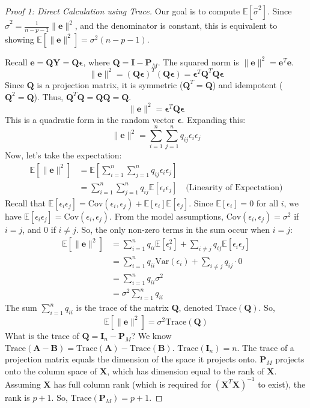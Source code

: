 \documentclass[11pt, letterpaper]{article}
\theoremstyle{definition}
\newcommand{\E}{\mathbb{E}}
\newcommand{\Var}{\text{Var}}
\newcommand{\Cov}{\text{Cov}}
\newcommand{\Trace}{\text{Trace}}
\newcommand{\mat}[1]{\mathbf{#1}} %
\newcommand{\vect}[1]{\boldsymbol{#1}} %
\newcommand{\T}{^T} %
\begin{document}
\begin{proof}[Proof 1: Direct Calculation using Trace]
Our goal is to compute $\E[\hat{\sigma}^2]$. Since $\hat{\sigma}^2 = \frac{1}{n-p-1} \|\vect{e}\|^2$, and the denominator is constant, this is equivalent to showing $\E[\|\vect{e}\|^2] = \sigma^2(n-p-1)$.

Recall $\vect{e} = \mat{Q}\vect{Y} = \mat{Q}\vect{\epsilon}$, where $\mat{Q} = \mat{I} - \mat{P}_M$. The squared norm is $\|\vect{e}\|^2 = \vect{e}\T\vect{e}$.
\[
\|\vect{e}\|^2 = (\mat{Q}\vect{\epsilon})\T (\mat{Q}\vect{\epsilon}) = \vect{\epsilon}\T \mat{Q}\T \mat{Q} \vect{\epsilon}
\]
Since $\mat{Q}$ is a projection matrix, it is symmetric ($\mat{Q}\T = \mat{Q}$) and idempotent ($\mat{Q}^2 = \mat{Q}$). Thus, $\mat{Q}\T\mat{Q} = \mat{Q}\mat{Q} = \mat{Q}$.
\[
\|\vect{e}\|^2 = \vect{\epsilon}\T \mat{Q} \vect{\epsilon}
\]
This is a quadratic form in the random vector $\vect{\epsilon}$. Expanding this:
\[
\|\vect{e}\|^2 = \sum_{i=1}^n \sum_{j=1}^n q_{ij} \epsilon_i \epsilon_j
\]
Now, let's take the expectation:
\begin{align*}
\E[\|\vect{e}\|^2] &= \E\left[\sum_{i=1}^n \sum_{j=1}^n q_{ij} \epsilon_i \epsilon_j\right] \\
&= \sum_{i=1}^n \sum_{j=1}^n q_{ij} \E[\epsilon_i \epsilon_j] \quad \text{(Linearity of Expectation)}
\end{align*}
Recall that $\E[\epsilon_i \epsilon_j] = \Cov(\epsilon_i, \epsilon_j) + \E[\epsilon_i]\E[\epsilon_j]$. Since $\E[\epsilon_i] = 0$ for all $i$, we have $\E[\epsilon_i \epsilon_j] = \Cov(\epsilon_i, \epsilon_j)$.
From the model assumptions, $\Cov(\epsilon_i, \epsilon_j) = \sigma^2$ if $i=j$, and $0$ if $i \neq j$.
So, the only non-zero terms in the sum occur when $i=j$:
\begin{align*}
\E[\|\vect{e}\|^2] &= \sum_{i=1}^n q_{ii} \E[\epsilon_i^2] + \sum_{i \neq j} q_{ij} \E[\epsilon_i \epsilon_j] \\
&= \sum_{i=1}^n q_{ii} \Var(\epsilon_i) + \sum_{i \neq j} q_{ij} \cdot 0 \\
&= \sum_{i=1}^n q_{ii} \sigma^2 \\
&= \sigma^2 \sum_{i=1}^n q_{ii}
\end{align*}
The sum $\sum_{i=1}^n q_{ii}$ is the trace of the matrix $\mat{Q}$, denoted $\Trace(\mat{Q})$. So,
\[
\E[\|\vect{e}\|^2] = \sigma^2 \Trace(\mat{Q})
\]
What is the trace of $\mat{Q} = \mat{I}_n - \mat{P}_M$? We know $\Trace(\mat{A} - \mat{B}) = \Trace(\mat{A}) - \Trace(\mat{B})$.
$\Trace(\mat{I}_n) = n$.
The trace of a projection matrix equals the dimension of the space it projects onto. $\mat{P}_M$ projects onto the column space of $\mat{X}$, which has dimension equal to the rank of $\mat{X}$. Assuming $\mat{X}$ has full column rank (which is required for $(\mat{X}\T\mat{X})^{-1}$ to exist), the rank is $p+1$. So, $\Trace(\mat{P}_M) = p+1$.

\end{proof}
\end{document}
